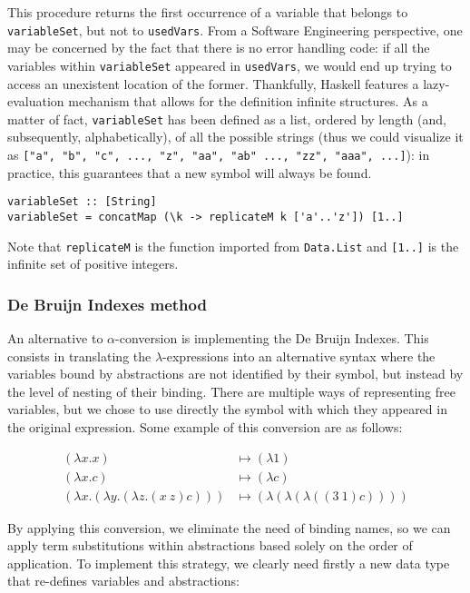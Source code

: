 \documentclass{article}
\begin{document}
This procedure returns the first occurrence of a variable that belongs to \lstinline|variableSet|, but not to \lstinline|usedVars|. From a Software Engineering perspective, one may be concerned by the fact that there is no error handling code: if all the variables within \lstinline|variableSet| appeared in \lstinline|usedVars|, we would end up trying to access an unexistent location of the former. Thankfully, Haskell features a lazy-evaluation mechanism that allows for the definition infinite structures. As a matter of fact, \lstinline|variableSet| has been defined as a list, ordered by length (and, subsequently, alphabetically), of all the possible strings (thus we could visualize it as \lstinline|["a", "b", "c", ..., "z", "aa", "ab" ..., "zz", "aaa", ...]|): in practice, this guarantees that a new symbol will always be found.

\begin{lstlisting}
variableSet :: [String]
variableSet = concatMap (\k -> replicateM k ['a'..'z']) [1..]
\end{lstlisting}

Note that \lstinline|replicateM| is the function imported from \lstinline|Data.List| and \lstinline|[1..]| is the infinite set of positive integers.

\subsubsection{De Bruijn Indexes method}

An alternative to $\alpha$-conversion is implementing the De Bruijn Indexes. This consists in translating the $\lambda$-expressions into an alternative syntax where the variables bound by abstractions are not identified by their symbol, but instead by the level of nesting of their binding. There are multiple ways of representing free variables, but we chose to use directly the symbol with which they appeared in the original expression. Some example of this conversion are as follows:

\begin{align*}
(\lambda x . x) &\mapsto (\lambda 1)\\
(\lambda x . c) &\mapsto (\lambda c)\\
(\lambda x . (\lambda y . (\lambda z . (x\ z) c))) &\mapsto (\lambda(\lambda(\lambda ((3\ 1) c))))
\end{align*}

By applying this conversion, we eliminate the need of binding names, so we can apply term substitutions within abstractions based solely on the order of application. To implement this strategy, we clearly need firstly a new data type that re-defines variables and abstractions:
\end{document}
